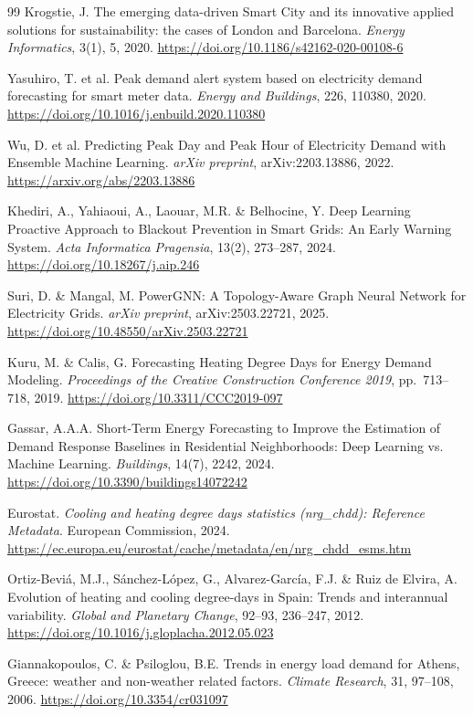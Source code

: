 \documentclass[12pt, a4paper]{article}
\begin{document}
\begin{thebibliography}{99}
Krogstie, J. The emerging data-driven Smart City and its innovative applied solutions for sustainability: the cases of London and Barcelona. \textit{Energy Informatics}, 3(1), 5, 2020.
\url{https://doi.org/10.1186/s42162-020-00108-6}

Yasuhiro, T. et al. Peak demand alert system based on electricity demand forecasting for smart meter data. \textit{Energy and Buildings}, 226, 110380, 2020.
\url{https://doi.org/10.1016/j.enbuild.2020.110380}

Wu, D. et al. Predicting Peak Day and Peak Hour of Electricity Demand with Ensemble Machine Learning. \textit{arXiv preprint}, arXiv:2203.13886, 2022.
\url{https://arxiv.org/abs/2203.13886}

Khediri, A., Yahiaoui, A., Laouar, M.R. \& Belhocine, Y. Deep Learning Proactive Approach to Blackout Prevention in Smart Grids: An Early Warning System. \textit{Acta Informatica Pragensia}, 13(2), 273--287, 2024.
\url{https://doi.org/10.18267/j.aip.246}

Suri, D. \& Mangal, M. PowerGNN: A Topology-Aware Graph Neural Network for Electricity Grids. \textit{arXiv preprint}, arXiv:2503.22721, 2025.
\url{https://doi.org/10.48550/arXiv.2503.22721}

Kuru, M. \& Calis, G. Forecasting Heating Degree Days for Energy Demand Modeling. \textit{Proceedings of the Creative Construction Conference 2019}, pp.~713--718, 2019.
\url{https://doi.org/10.3311/CCC2019-097}

Gassar, A.A.A. Short-Term Energy Forecasting to Improve the Estimation of Demand Response Baselines in Residential Neighborhoods: Deep Learning vs. Machine Learning. \textit{Buildings}, 14(7), 2242, 2024.
\url{https://doi.org/10.3390/buildings14072242}

Eurostat. \textit{Cooling and heating degree days statistics (nrg\_chdd): Reference Metadata}. European Commission, 2024.
\url{https://ec.europa.eu/eurostat/cache/metadata/en/nrg_chdd_esms.htm}

Ortiz-Beviá, M.J., Sánchez-López, G., Alvarez-García, F.J. \& Ruiz de Elvira, A. Evolution of heating and cooling degree-days in Spain: Trends and interannual variability. \textit{Global and Planetary Change}, 92--93, 236--247, 2012.
\url{https://doi.org/10.1016/j.gloplacha.2012.05.023}

Giannakopoulos, C. \& Psiloglou, B.E. Trends in energy load demand for Athens, Greece: weather and non-weather related factors. \textit{Climate Research}, 31, 97--108, 2006.
\url{https://doi.org/10.3354/cr031097}


\end{thebibliography}
\end{document}
